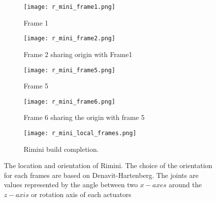 \begin{figure}[h!]
  \centering
  \captionsetup{justification=centering}
  \begin{subfigure}[t]{0.2\linewidth}
    \texttt{[image: r\_mini\_frame1.png]}
     \caption{Frame 1}
  \end{subfigure}
  \begin{subfigure}[t]{0.2\linewidth}
    \texttt{[image: r\_mini\_frame2.png]}
    \caption{Frame 2 sharing origin with Frame1}
  \end{subfigure}
  \begin{subfigure}[t]{0.2\linewidth}
    \texttt{[image: r\_mini\_frame5.png]}
    \caption{Frame 5}
  \end{subfigure}
  \begin{subfigure}[t]{0.2\linewidth}
    \texttt{[image: r\_mini\_frame6.png]}
    \caption{Frame 6 sharing the origin with frame 5}
  \end{subfigure}
  \begin{subfigure}[b]{0.4\linewidth}
    \texttt{[image: r\_mini\_local\_frames.png]}
    \caption{Rimini build completion.}
  \end{subfigure}

\caption{The location and orientation of Rimini. The choice of the orientation for each frames are based on Denavit-Hartenberg.
          The joints are values represented by the angle between two $x-axes$ around the $z-axis$ or rotation axis of each actuators }
  \label{fig:rimini_joints}
\end{figure}
